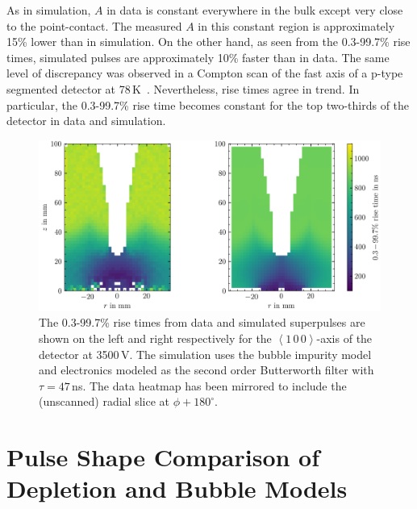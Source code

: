 As in simulation, $A$ in data is constant everywhere in the bulk except very close to the point-contact. The measured $A$ in this constant region is approximately 15\% lower than in simulation. On the other hand, as seen from the 0.3-99.7\% rise times, simulated pulses are approximately 10\% faster than in data. The same level of discrepancy was observed in a Compton scan of the fast axis of a p-type segmented detector at 78\,K~\cite{felix_masters}. Nevertheless, rise times agree in trend. In particular, the 0.3-99.7\% rise time becomes constant for the top two-thirds of the detector in data and simulation. 
\begin{figure}[H]
    \centering
    \includegraphics[width=6in]{figs/sim/DT_fast_axis_data_sim_comp.png}
    \caption{The 0.3-99.7\% rise times from data and simulated superpulses are shown on the left and right respectively for the $\left<1\,0\,0\right>$-axis  of the detector at 3500\,V. The simulation uses the bubble impurity model and electronics modeled as the second order Butterworth filter with $\tau = 47$\,ns. The data heatmap has been mirrored to include the (unscanned) radial slice at $\phi+180^\circ$.}
    \label{fig:DT_fast_axis_data_sim_comp}
\end{figure}

\section{Pulse Shape Comparison of Depletion and Bubble Models}\label{sec:impcomp}

